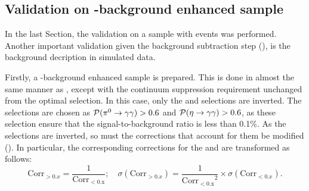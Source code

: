 \subsection{Validation on \texorpdfstring{\BB}{BB}-background enhanced sample}\label{sec:bb_background_validation}

In the last Section, the validation on a sample with \epem\ra\qqbar events was performed.
Another important validation given the background subtraction step (),
is the \BB background decription in simulated data.

Firstly, a \BB-background enhanced sample is prepared.
This is done in almost the same manner as , except with the continuum suppression requirement unchanged from the optimal selection.
In this case, only the \piVeto and \etaVeto selections are inverted.
The selections are chosen as ${\mathcal{P}(\pi^0\rightarrow\gamma\gamma)}>0.6$ and ${\mathcal{P}(\eta\rightarrow\gamma\gamma)}>0.6$, as these selection ensure that the signal-to-background ratio is less than 0.1\%.
As the selections are inverted, so must the corrections that account for them be modified ().
In particular, the corresponding corrections for the \piVeto and \etaVeto are transformed as follows:
\begin{equation}\label{eq:correction_transform}
    \mathrm{Corr}_{>0.x} = \frac{1}{\mathrm{Corr_{<0.x}}}; \quad \sigma(\mathrm{Corr}_{>0.x}) =  \frac{1}{\mathrm{Corr_{<0.x}}^2} \times \sigma(\mathrm{Corr}_{<0.x}).
\end{equation}

